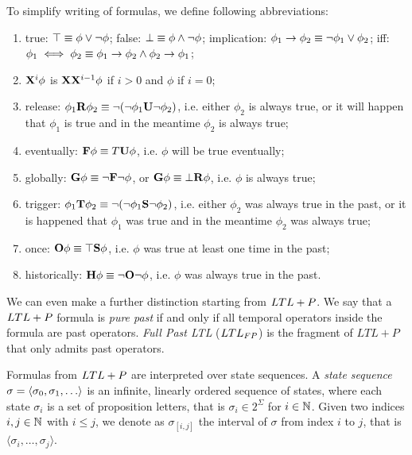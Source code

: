 To simplify writing of formulas, we define following abbreviations:
\begin{enumerate}[label=\roman*.]
    \item true: $\top \equiv \phi \lor \neg \phi$; false: $\bot \equiv \phi \land \neg \phi$; implication: $\phi_1 \to \phi_2 \equiv \neg \phi_1 \lor \phi_2$; iff: $\phi_1 \iff \phi_2 \equiv \phi_1 \to \phi_2 \land \phi_2 \to \phi_1$;
    \item $\mathbf{X}^{i} \phi$ is $\mathbf{X} \mathbf{X}^{i-1} \phi$ if $i > 0$ and $\phi$ if $i=0$;
    \item release: $\phi_1 \mathbf{R} \phi_2 \equiv \neg (\neg \phi_1 \mathbf{U} \neg \phi_2)$, i.e. either $\phi_2$ is always true, or it will happen that $\phi_1$ is true and in the meantime $\phi_2$ is always true; 
    \item eventually: $\mathbf{F} \phi \equiv T \mathbf{U} \phi$, i.e. $\phi$ will be true eventually;
    \item globally: $\mathbf{G} \phi \equiv \neg \mathbf{F} \neg \phi$, or $\mathbf{G} \phi \equiv \bot \mathbf{R} \phi$, i.e. $\phi$ is always true;
    \item trigger: $\phi_1 \mathbf{T} \phi_2 \equiv \neg (\neg \phi_1 \mathbf{S} \neg \phi_2)$, i.e. either $\phi_2$ was always true in the past, or it is happened that $\phi_1$ was true and in the meantime $\phi_2$ was always true;
    \item once: $\mathbf{O} \phi \equiv \top \mathbf{S} \phi$, i.e. $\phi$ was true at least one time in the past; 
    \item historically: $\mathbf{H} \phi \equiv \neg \mathbf{O} \neg \phi$, i.e. $\phi$ was always true in the past.
\end{enumerate}

We can even make a further distinction starting from $LTL+P$. We say that a $LTL+P$ formula is \textit{pure past} if and only if all temporal operators inside the formula are past operators.
\textit{Full Past LTL} ($LTL_{FP}$) is the fragment of $LTL+P$ that only admits past operators.

Formulas from $LTL+P$ are interpreted over state sequences. A \textit{state sequence} $\sigma = \sequence{\sigma_0,\sigma_1,\dots}$ is an infinite, linearly ordered sequence of states, where each state $\sigma_i$ is a set of proposition letters, that is $\sigma_i \in 2^\Sigma$ for $i \in \mathbb{N}$. Given two indices $i,j \in \mathbb{N}$ with $i \leq j$, we denote as $\sigma_{[i,j]}$ the interval of $\sigma$ from index $i$ to $j$, that is $\langle \sigma_i,\dots,\sigma_j \rangle$.

